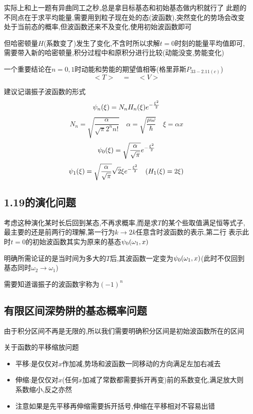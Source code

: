 \documentclass{article}
\begin{document}
            实际上和上一题有异曲同工之秒,总是拿目标基态和初始基态做内积就行了
            此题的不同点在于求平均能量,需要用到粒子现在处的态(波函数),突然变化的势场会改变处于当前态的概率,但波函数还来不及变化,使用初始波函数即可
            
            但哈密顿量$H$(系数变了)发生了变化,不含时所以求解$t=0$时刻的能量平均值即可,
            需要带入新的哈密顿量,积分过程中和原积分进行比较(动能没变,势能变化)
            
            一个重要结论在$n=0,1$时动能和势能的期望值相等(格里菲斯$P_{33-2.11(c)}$)
            $$ <T> \quad = \quad  <V> $$

            建议记谐振子波函数的形式
            $$ \psi_{n} (\xi) = N_{n} H_{n}(\xi) e^{-\frac{\xi^{2}}{2}} $$
            $$ N_{n} = \sqrt{\frac{\alpha}{\sqrt{\pi}2^{n} n!}}  \quad \alpha = \sqrt{\frac{\mu \omega}{\hbar}} \quad \xi = \alpha x $$
            $$ \psi_{0} (\xi) = \sqrt{\frac{\alpha}{\sqrt{\pi}}} e^{-\frac{\xi^{2}}{2}} $$
            $$ \psi_{1} (\xi) = \sqrt{\frac{\alpha}{\sqrt{\pi}}} \sqrt{2} \xi e^{-\frac{\xi^{2}}{2}} \quad (H_{1}(\xi) = 2\xi) $$
            
        \subsection{1.19的演化问题}
            考虑这种演化某时长后回到某态,不再求概率,而是求$T$的某个些取值满足恒等式子,最主要的还是前两行的理解,第一行为$k \to 2k$任意含时波函数的表示,第二行
            表示此时$t = 0$的初始波函数其实为原来的基态$\psi_{0} (\omega_{1},x)$
            
            明确所需论证的是当时间为多大的$T$后,其波函数一定变为$\psi_{0} (\omega_{1},x)$(此时不仅回到基态同时$\omega_{2} \to \omega_{1}$)

            需要知道谐振子的波函数宇称为$(-1)^{n}$

        \subsection{有限区间深势阱的基态概率问题}
            由于积分区间不再是无限的,所以我们需要明确积分区间是初始波函数所在的区间
            
            关于函数的平移缩放问题
            \begin{itemize}
                \item 平移:是仅仅对$x$作加减,势场和波函数一同移动的方向满足左加右减去
                \item 伸缩:是仅仅对$x$(任何$x$加减了常数都需要拆开再变)前的系数变化,满足放大则系数缩小,反之亦然
                \item 注意如果是先平移再伸缩需要拆开括号,伸缩在平移相对不容易出错
            \end{itemize}
\end{document}

